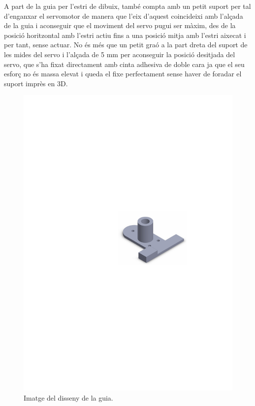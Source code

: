 A part de la guia per l’estri de dibuix, també compta amb un petit suport per tal d’enganxar el servomotor de manera que l’eix d’aquest coincideixi amb l’alçada de la guia i aconseguir que el moviment del servo pugui ser màxim, des de la posició horitzontal amb l’estri actiu fins a una posició mitja amb l’estri aixecat i per tant, sense actuar. No és més que un petit graó a la part dreta del suport de les mides del servo i l’alçada de 5 mm per aconseguir la posició desitjada del servo, que s’ha fixat directament amb cinta adhesiva de doble cara ja que el seu esforç no és massa elevat i queda el fixe perfectament sense haver de foradar el suport imprès en 3D. 

\begin{figure}[H]
	\centering
	\includegraphics{guia}
	\caption{Imatge del disseny de la guia.}
	\label{fig:guia}
\end{figure}


